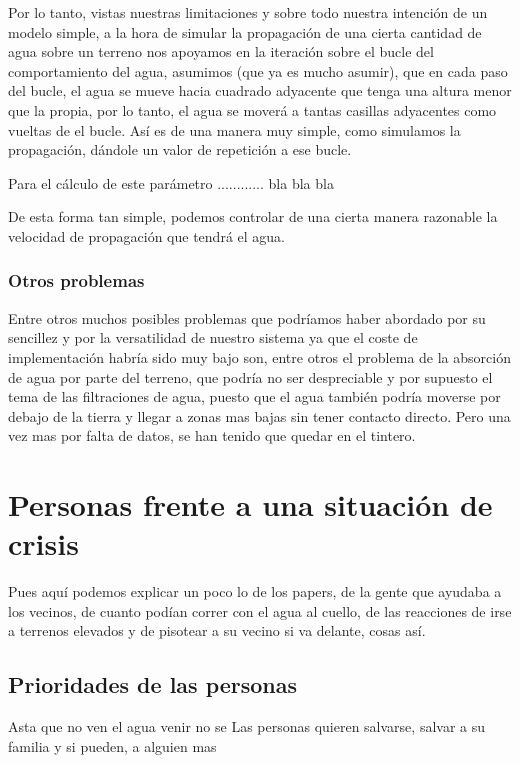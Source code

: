 Por lo tanto, vistas nuestras limitaciones y sobre todo nuestra intención de un modelo simple, a la hora de simular la propagación de una cierta cantidad de agua sobre un terreno nos apoyamos en la iteración sobre el bucle del comportamiento del agua, asumimos (que ya es mucho asumir), que en cada paso del bucle, el agua se mueve hacia cuadrado adyacente que tenga una altura menor que la propia, por lo tanto, el agua se moverá a tantas casillas adyacentes como vueltas de el bucle. Así es de una manera muy simple, como simulamos la propagación, dándole un valor de repetición a ese bucle.

Para el cálculo de este parámetro ............ bla bla bla

De esta forma tan simple, podemos controlar de una cierta manera razonable la velocidad de propagación que tendrá el agua.

\subsubsection*{Otros problemas}

Entre otros muchos posibles problemas que podríamos haber abordado por su sencillez y por la versatilidad de nuestro sistema ya que el coste de implementación habría sido muy bajo son, entre otros el problema de la absorción de agua por parte del terreno, que podría no ser despreciable y por supuesto el tema de las filtraciones de agua, puesto que el agua también podría moverse por debajo de la tierra y llegar a zonas mas bajas sin tener contacto directo. Pero una vez mas por falta de datos, se han tenido que quedar en el tintero.

\section*{Personas frente a una situación de crisis}

Pues aquí podemos explicar un poco lo de los papers, de la gente que ayudaba a los vecinos, de
cuanto podían correr con el agua al cuello, de las reacciones de irse a terrenos elevados y de 
pisotear a su vecino si va delante, cosas así.

\subsection*{Prioridades de las personas}

Asta que no ven el agua venir no se Las personas quieren salvarse, salvar a su familia y si pueden, a alguien mas

